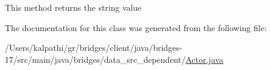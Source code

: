 This method returns the string value 

The documentation for this class was generated from the following file\+:\begin{DoxyCompactItemize}
\item 
/\+Users/kalpathi/gr/bridges/client/java/bridges-\/17/src/main/java/bridges/data\+\_\+src\+\_\+dependent/\mbox{\hyperlink{_actor_8java}{Actor.\+java}}\end{DoxyCompactItemize}
